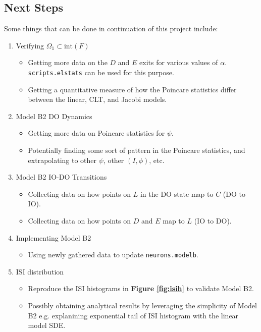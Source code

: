 \documentclass[letterpaper,12pt]{article}
\numberwithin{table}{section}
\numberwithin{figure}{section}
\numberwithin{equation}{section}
\newcommand{\reffig}[1]{\textbf{Figure \ref{#1}}}
\begin{document}
\begin{flushleft}
    \section{Next Steps}
    Some things that can be done in continuation of this project include:
    \begin{enumerate}
        \item Verifying $\Omega_1 \subset \text{int}(F)$
        \begin{itemize}
            \item Getting more data on the $D$ and $E$ exits for various values of $\alpha$. \texttt{scripts.elstats} can be used for this purpose.
            \item Getting a quantitative measure of how the Poincare statistics differ between the linear, CLT, and Jacobi models.
        \end{itemize}
        \item Model B2 DO Dynamics
        \begin{itemize}
            \item Getting more data on Poincare statistics for $\psi$.
            \item Potentially finding some sort of pattern in the Poincare statistics, and extrapolating to other $\psi$, other $(I, \phi)$, etc.
        \end{itemize}
        \item Model B2 IO-DO Transitions
        \begin{itemize}
            \item Collecting data on how points on $L$ in the DO state map to $C$ (DO to IO).
            \item Collecting data on how points on $D$ and $E$ map to $L$ (IO to DO).
        \end{itemize}
        \item Implementing Model B2
        \begin{itemize}
            \item Using newly gathered data to update \texttt{neurons.modelb}.
        \end{itemize}
        \item ISI distribution
        \begin{itemize}
            \item Reproduce the ISI histograms in \reffig{fig:isih} to validate Model B2.
            \item Possibly obtaining analytical results by leveraging the simplicity of Model B2 e.g. explanining exponential tail of ISI histogram with the linear model SDE.
        \end{itemize}
    \end{enumerate}


    \pagebreak

    
    

\end{flushleft}
\end{document}
